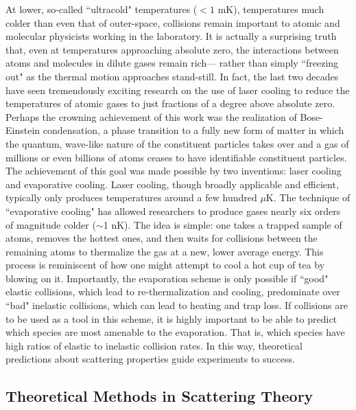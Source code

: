 \documentclass[%
 reprint,
 amsmath,amssymb,
 aps,
 nofootinbib
]{revtex4-1}
\begin{document}
At lower, so-called ``ultracold" temperatures ($< 1$ mK), temperatures much colder than even that of outer-space, collisions remain important to atomic and molecular physicists working in the laboratory. It is actually a surprising truth that, even at temperatures approaching absolute zero, the interactions between atoms and molecules in dilute gases remain rich--- rather than simply ``freezing out" as the thermal motion approaches stand-still. In fact, the last two decades have seen tremendously exciting research on the use of laser cooling to reduce the temperatures of atomic gases to just fractions of a degree above absolute zero. Perhaps the crowning achievement of this work was the realization of Bose-Einstein condensation, a phase transition to a fully new form of matter in which the quantum, wave-like nature of the constituent particles takes over and a gas of millions or even billions of atoms ceases to have identifiable constituent particles. The achievement of this goal was made possible by two inventions: laser cooling and evaporative cooling. Laser cooling, though broadly applicable and efficient, typically only produces temperatures around a few hundred $\mu$K. The technique of ``evaporative cooling" has allowed researchers to produce gases nearly six orders of magnitude colder ($\sim$1 nK). The idea is simple: one takes a trapped sample of atoms, removes the hottest ones, and then waits for collisions between the remaining atoms to thermalize the gas at a new, lower average energy. This process is reminiscent of how one might attempt to cool a hot cup of tea by blowing on it. Importantly, the evaporation scheme is only possible if  ``good" elastic collisions, which lead to re-thermalization and cooling, predominate over ``bad" inelastic collisions, which can lead to heating and trap loss. If collisions are to be used as a tool in this scheme, it is highly important to be able to predict which species are most amenable to the evaporation. That is, which species have high ratios of elastic to inelastic collision rates. In this way, theoretical predictions about scattering properties guide experiments to success.

\subsection{Theoretical Methods in Scattering Theory}
\end{document}
